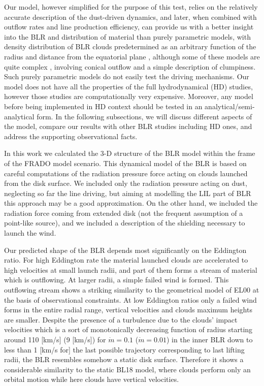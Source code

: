 \documentclass[twocolumn]{aastex62}
\begin{document}
Our model, however simplified for the purpose of this test, relies on the relatively accurate description of the dust-driven dynamics, and later, when combined with outflow rates and line production efficiency, can provide us with a better insight into the BLR and distribution of material than purely parametric models, with density distribution of BLR clouds predetermined as an arbitrary function of the radius and distance from the equatorial plane \citep[e.g.][]{pancoast2014,Gravity2020}, although some of these models are quite complex \citep[e.g.][]{matthews2020}, involving conical outflow and a simple description of clumpiness. Such purely parametric models do not easily test the driving mechanisms. Our model does not have all the properties of the full hydrodynamical (HD) studies, however those studies are computationally very expensive. Moreover, any model before being implemented in HD context should be tested in an analytical/semi-analytical form. In the following subsections, we will discuss different aspects of the model, compare our results with other BLR studies including HD ones, and address the supporting observational facts.

In this work we calculated the 3-D structure of the BLR model within the frame of the FRADO model scenario. This dynamical model of the BLR is based on careful computations of the radiation pressure force acting on clouds launched from the disk surface. We included only the radiation pressure acting on dust, neglecting so far the line driving, but aiming at modelling the LIL part of BLR this approach may be a good approximation. On the other hand, we included the radiation force coming from extended disk (not the frequent assumption of a point-like source), and we included a description of the shielding necessary to launch the wind.

Our predicted shape of the BLR depends most significantly on the Eddington ratio. For high Eddington rate the material launched clouds are accelerated to high velocities at small launch radii, and part of them forms a stream of material which is outflowing. At larger radii, a simple failed wind is formed. This outflowing stream shows a striking similarity to the geometrical model of EL00 at the basis of observational constraints. At low Eddington ratios only a failed wind forms in the entire radial range, vertical velocities and clouds maximum heights are smaller. Despite the presence of a turbulence due to the clouds' impact velocities which is a sort of monotonically decreasing function of radius starting around 110 [km/s] (9 [km/s]) for $\dot m = 0.1$ ($\dot m = 0.01$) in the inner BLR down to less than 1 [km/s for] the last possible trajectory corresponding to last lifting radii, the BLR resembles somehow a static disk surface. Therefore it shows a considerable similarity to the static BL18 model, where clouds perform only an orbital motion while here clouds have vertical velocities.
\end{document}
